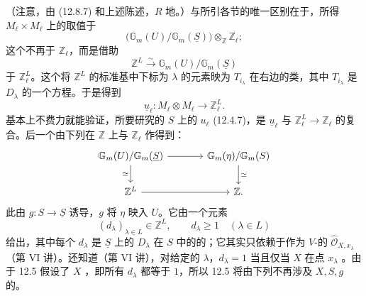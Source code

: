 （注意，由 (12.8.7) 和上述陈述，$R$ 地。）与所引各节的唯一区别在于，所得 $M_\ell\times M_\ell$ 上的取值于
\[
 \bigl(\mathbb G_m(U)/\mathbb G_m(\underline S)\bigr)\otimes_{\mathbb Z}\mathbb Z_\ell;
\]
这个不再于 $\mathbb Z_\ell$，而是借助
\[
 \mathbb Z^L\xrightarrow\sim\mathbb G_m(U)/\mathbb G_m(\underline S)\tag{12.8.10}
\]
于 $\mathbb Z_\ell^L$。这个将 $\mathbb Z^L$ 的标准基中下标为 $\lambda$ 的元素映为 $T_{i_\lambda}$ 在右边的类，其中 $T_{i_\lambda}$ 是 $D_\lambda$ 的一个方程。于是得到
\[
 \underline u_\ell:M_\ell\otimes M_\ell\longrightarrow\mathbb Z_\ell^L.\tag{12.8.11}
\]
基本上不费力就能验证，所要研究的 $S$ 上的 $u_\ell$ (12.4.7)，是 $\underline u_\ell$ 与 $\mathbb Z_\ell^L\to\mathbb Z_\ell$ 的复合。后一个由下列在 $\mathbb Z$ 上与 $\mathbb Z_\ell$ 作得到：
\[
\begin{tikzcd}[column sep=large]
 \mathbb G_m(U)/\mathbb G_m(\underline S)\arrow[r]\arrow[d,"\simeq"']
 &\mathbb G_m(\eta)/\mathbb G_m(S)\arrow[d,"\simeq"]\\
 \mathbb Z^L\arrow[r]&\mathbb Z.
\end{tikzcd}
\]
此由 $g:S\to\underline S$ 诱导，$g$ 将 $\eta$ 映入 $U$。它由一个元素
\[
 (d_\lambda)_{\lambda\in L}\in\mathbb Z^L,
 \qquad d_\lambda\geq1\quad(\lambda\in L)\tag{12.8.12}
\]
给出，其中每个 $d_\lambda$ 是 $\underline S$ 上的 $D_\lambda$ 在 $S$ 中的的；它其实只依赖于作为 $V$-的 $\widehat{\mathcal O}_{X,x_\lambda}$（第 VI 讲）。还知道（第 VI 讲），对给定的 $\lambda$，$d_\lambda=1$ 当且仅当 $X$ 在点 $x_\lambda$ 。由于 12.5 假设了 $X$ ，即所有 $d_\lambda$ 都等于 $1$，所以 12.5 将由下列不再涉及 $X,S,g$ 的。

